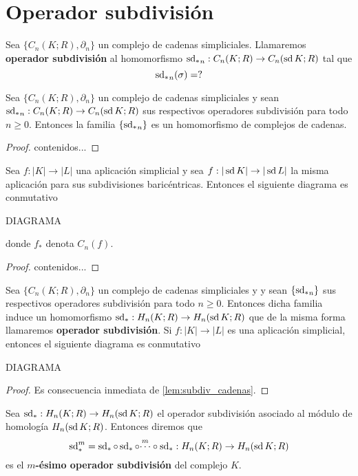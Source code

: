 \section{Operador subdivisión}
\begin{definicion}
	\label{def:op_subdiv}
	Sea $\{C_n(K;R), \partial_n\}$ un complejo de cadenas simpliciales. Llamaremos \textbf{operador subdivisión} al homomorfismo ${\operatorname{sd}_*}_n : C_n(K;R) \to C_n(\operatorname{sd} K;R)$ tal que
	\[
	{\operatorname{sd}_*}_n(\sigma) = ?
	\]
\end{definicion}

\begin{lema}
	Sea $\{C_n(K;R), \partial_n\}$ un complejo de cadenas simpliciales y sean ${\operatorname{sd}_*}_n : C_n(K;R) \to C_n(\operatorname{sd} K;R)$ sus respectivos operadores subdivisión para todo $n \geq 0$. Entonces la familia $\{{\operatorname{sd}_*}_n\}$ es un homomorfismo de complejos de cadenas.
\end{lema}
\begin{proof}
	contenidos...
\end{proof}

\begin{lema}
	\label{lem:subdiv_cadenas}
	Sea $f: |K| \to |L|$ una aplicación simplicial y sea $f: |\operatorname{sd} K| \to |\operatorname{sd} L|$ la misma aplicación para sus subdivisiones baricéntricas. Entonces el siguiente diagrama es conmutativo
	
	DIAGRAMA
	
	donde $f_*$ denota $C_n(f)$.
\end{lema}
\begin{proof}
	contenidos...
\end{proof}

\begin{proposicion}
	Sea $\{C_n(K;R), \partial_n\}$ un complejo de cadenas simpliciales y  y sean $\{{\operatorname{sd}_*}_n\}$ sus respectivos operadores subdivisión para todo $n \geq 0$. Entonces dicha familia induce un homomorfismo $\operatorname{sd}_*: H_n(K;R) \to H_n(\operatorname{sd} K;R)$ que de la misma forma llamaremos \textbf{operador subdivisión}. Si $f: |K| \to |L|$ es una aplicación simplicial, entonces el siguiente diagrama es conmutativo
	
	DIAGRAMA
\end{proposicion}
\begin{proof}
	Es consecuencia inmediata de \autoref{lem:subdiv_cadenas}.
\end{proof}

\begin{definicion}
	Sea $\operatorname{sd}_*: H_n(K;R) \to H_n(\operatorname{sd} K;R)$ el operador subdivisión asociado al módulo de homología $H_n(\operatorname{sd} K;R)$. Entonces diremos que 
	\[
	\operatorname{sd}_*^m = \operatorname{sd}_* \circ \operatorname{sd}_* \circ \overset{m}{\cdots} \circ \operatorname{sd}_*: H_n(K;R) \to H_n(\operatorname{sd} K;R)
	\]
	es el \textbf{$m$-ésimo operador subdivisión} del complejo $K$.
\end{definicion}

